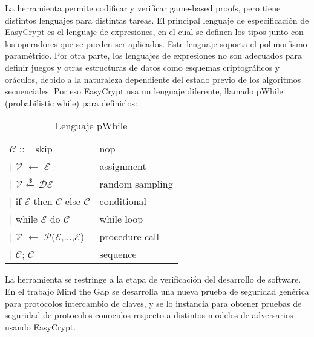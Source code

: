 \documentclass[runningheads]{llncs}
\begin{document}
La herramienta permite codificar y verificar game-based proofs, pero tiene distintos lenguajes para distintas tareas. El principal lenguaje de especificación de EasyCrypt es el lenguaje de expresiones, en el cual se definen los tipos junto con los operadores que se pueden ser aplicados. Este lenguaje soporta el polimorfismo paramétrico. Por otra parte, los lenguajes de expresiones no son adecuados para definir juegos y otras estructuras de datos como esquemas criptográficos y oráculos, debido a la naturaleza dependiente del estado previo de los algoritmos secuenciales. Por eso EasyCrypt usa un lenguaje diferente, llamado pWhile\cite{ref_book1} (probabilistic while) para definirlos:

\begin{table}[H]
  \setlength{\tabcolsep}{12pt}
  \caption{Lenguaje pWhile}
  \label{tab:simple}
  \centering
  \begin{tabular}{ll}
    \toprule
    $\mathcal{C}$ ::= skip & nop\\
    \hspace{0.5cm}| $\mathcal{V}$	$\xleftarrow{}$ $\mathcal{E}$ & assignment\\
    \hspace{0.5cm}| $\mathcal{V}$ $\xleftarrow{\text{\textdollar}}$ $\mathcal{D}$$\mathcal{E}$ & random sampling\\
    \hspace{0.5cm}| if $\mathcal{E}$ then $\mathcal{C}$ else $\mathcal{C}$ & conditional\\
    \hspace{0.5cm}| while $\mathcal{E}$ do $\mathcal{C}$ & while loop\\
    \hspace{0.5cm}| $\mathcal{V}$	$\xleftarrow{}$ $\mathcal{P}$($\mathcal{E}$,...,$\mathcal{E}$) & procedure call\\
    \hspace{0.5cm}| $\mathcal{C}$; $\mathcal{C}$ & sequence\\
    \bottomrule
  \end{tabular}
\end{table}


La herramienta se restringe a la etapa de verificación del desarrollo de software. En el trabajo Mind the Gap\cite{ref_article2} se desarrolla una nueva prueba de seguridad genérica para protocolos intercambio de claves, y se lo instancia para obtener pruebas de seguridad de protocolos conocidos respecto a distintos modelos de adversarios usando EasyCrypt.
\end{document}

